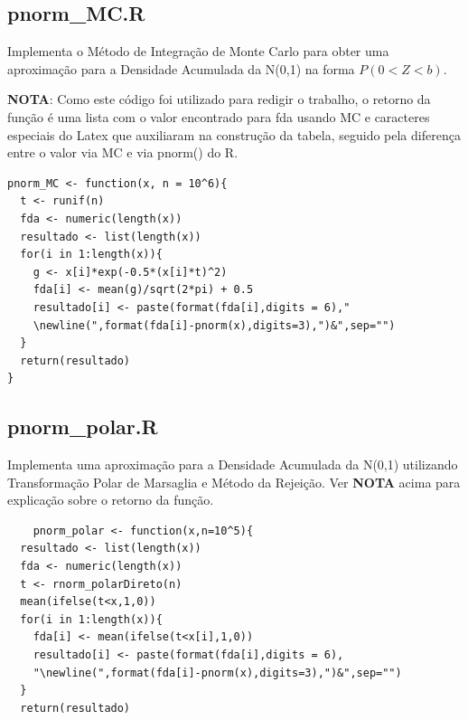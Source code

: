 \documentclass[
	article,			%
	12pt,				%
	twoside,			%
	a4paper,			%
	english,			%
	brazil,				%
	]{abntex2}
\begin{document}
\subsection{pnorm\_MC.R}
Implementa o Método de Integração de Monte Carlo para obter uma aproximação para a Densidade Acumulada da N(0,1) na forma $P(0<Z<b)$. 

\textbf{NOTA}: Como este código foi utilizado para redigir o trabalho, o retorno da função é uma lista com o valor encontrado para fda usando MC e caracteres especiais do Latex que auxiliaram na construção da tabela, seguido pela diferença entre o valor via MC e via pnorm() do R.

\begin{lstlisting}
pnorm_MC <- function(x, n = 10^6){
  t <- runif(n)
  fda <- numeric(length(x))
  resultado <- list(length(x))
  for(i in 1:length(x)){
    g <- x[i]*exp(-0.5*(x[i]*t)^2)
    fda[i] <- mean(g)/sqrt(2*pi) + 0.5
    resultado[i] <- paste(format(fda[i],digits = 6),"
    \newline(",format(fda[i]-pnorm(x),digits=3),")&",sep="")
  }
  return(resultado)
}
\end{lstlisting}

\subsection{pnorm\_polar.R}
Implementa uma aproximação para a Densidade Acumulada da N(0,1) utilizando Transformação Polar de Marsaglia e Método da Rejeição. Ver \textbf{NOTA} acima para explicação sobre o retorno da função.

\begin{lstlisting}
	pnorm_polar <- function(x,n=10^5){
  resultado <- list(length(x))
  fda <- numeric(length(x))
  t <- rnorm_polarDireto(n)
  mean(ifelse(t<x,1,0))
  for(i in 1:length(x)){
    fda[i] <- mean(ifelse(t<x[i],1,0))
    resultado[i] <- paste(format(fda[i],digits = 6),
    "\newline(",format(fda[i]-pnorm(x),digits=3),")&",sep="")
  }
  return(resultado)
\end{lstlisting}
\end{document}

